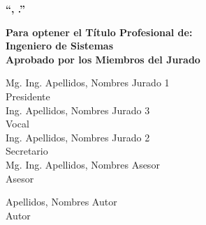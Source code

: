 \begin{titlepage}
\begin{spacing}{1.5}
	\centering
	{\fontsize{\TamOtrosIn}{0pt} \textbf{``\titulo, \subtitulo.''}}\\[1cm]
\end{spacing}

{\fontsize{\TamOtrosIn}{0pt} \textbf{Para optener el Título Profesional de:}}
\\[0.5cm]
{\fontsize{\TamOtrosIn}{0pt} \textbf{{Ingeniero de Sistemas}}}
\\[1cm]
{\fontsize{\TamOtrosJP}{0pt} \textbf{Aprobado por los Miembros del Jurado}}
\\[0cm]
\vspace{2cm}
\begin{multicols}{2}
	\centering
	\vspace{2cm}
	Mg. Ing. Apellidos, Nombres Jurado 1\\
	Presidente\\
	\vspace{2cm}
	Ing. Apellidos, Nombres Jurado 3\\
	Vocal\\
	\columnbreak
	\vspace{2cm}
	Ing. Apellidos, Nombres Jurado 2\\
	Secretario\\
	\vspace{2cm}
	Mg. Ing. Apellidos, Nombres Asesor\\
	Asesor\\
\end{multicols}
\vspace{2cm}
Apellidos, Nombres Autor\\
Autor\\
\end{titlepage}

\if{}
\tikzexternalenable %
\fi
\restoregeometry